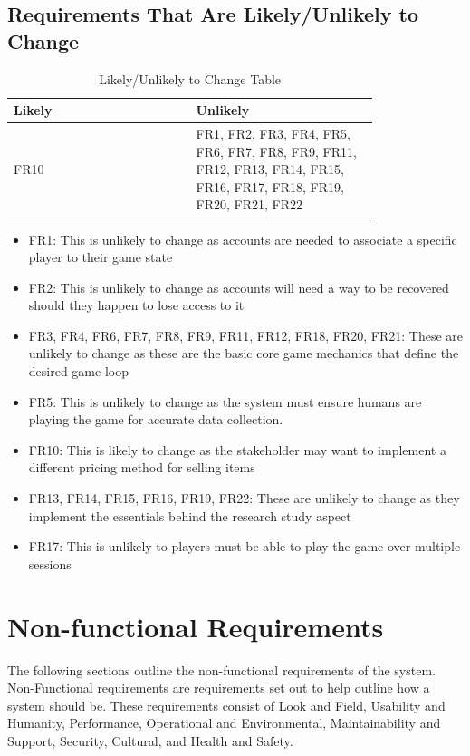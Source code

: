 \documentclass{article}
\begin{document}
\subsection{Requirements That Are Likely/Unlikely to Change}
\begin{table}[H]
    \centering
    \begin{tabular}{|p{0.40\linewidth} | p{0.40\linewidth}|}
    \hline
         Likely & Unlikely \\
         \hline
         FR10 & FR1, FR2, FR3, FR4, FR5, FR6, FR7, FR8, FR9, FR11, FR12, FR13, FR14, FR15, FR16, FR17, FR18, FR19, FR20, FR21, FR22  \\
         \hline
    \end{tabular}
    \caption{Likely/Unlikely to Change Table}
    \label{tab:my_label}
\end{table}
\begin{itemize}
    \item FR1: This is unlikely to change as accounts are needed to associate a specific player to their game state
    \item FR2: This is unlikely to change as accounts will need a way to be recovered should they happen to lose access to it
    \item FR3, FR4, FR6, FR7, FR8, FR9, FR11, FR12, FR18, FR20, FR21: These are unlikely to change as these are the basic core game mechanics that define the desired game loop
    \item FR5: This is unlikely to change as the system must ensure humans are playing the game for accurate data collection.
    \item FR10: This is likely to change as the stakeholder may want to implement a different pricing method for selling items
    \item FR13, FR14, FR15, FR16, FR19, FR22: These are unlikely to change as they implement the essentials behind the research study aspect
    \item FR17: This is unlikely to players must be able to play the game over multiple sessions
    
\end{itemize}

\section{Non-functional Requirements}
The following sections outline the non-functional requirements of the system. Non-Functional requirements are requirements set out to help outline how a system should be. These requirements consist of Look and Field, Usability and Humanity, Performance, Operational and Environmental, Maintainability and Support, Security, Cultural, and Health and Safety. 
\end{document}
